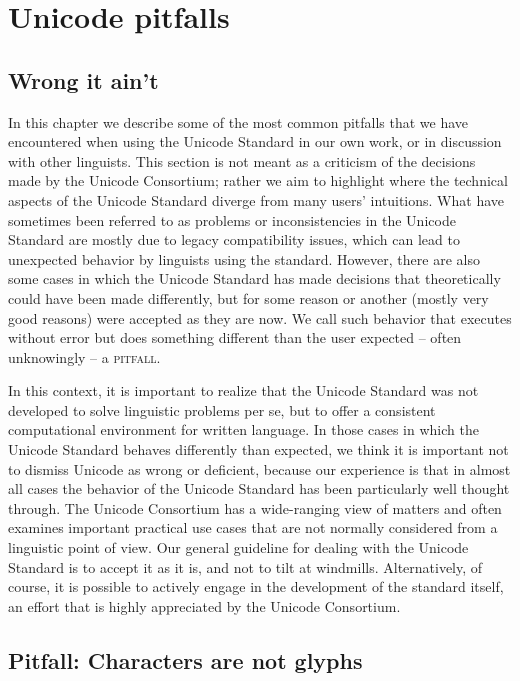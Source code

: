 \chapter{Unicode pitfalls}
\label{unicode-pitfalls}

\section{Wrong it ain't}
\label{wrong-it-is-not}

In this chapter we describe some of the most common pitfalls that we have
encountered when using the Unicode Standard in our own work, or in discussion
with other linguists. This section is not meant as a criticism of the decisions
made by the Unicode Consortium; rather we aim to highlight where the
technical aspects of the Unicode Standard diverge from many users'
intuitions. What have sometimes been referred to as problems or inconsistencies
in the Unicode Standard are mostly due to legacy compatibility issues, which can
lead to unexpected behavior by linguists using the standard. However, there are
also some cases in which the Unicode Standard has made decisions that
theoretically could have been made differently, but for some reason or another
(mostly very good reasons) were accepted as they are now. We call such behavior that
executes without error but does something different than the user
expected -- often unknowingly -- a \textsc{pitfall}.

In this context, it is important to realize that the Unicode Standard was not
developed to solve linguistic problems per se, but to offer a consistent
computational environment for written language. In those cases in which the
Unicode Standard behaves differently than expected, we think it is important not
to dismiss Unicode as wrong or deficient, because our
experience is that in almost all cases the behavior of the Unicode Standard has
been particularly well thought through. The Unicode Consortium has a 
wide-ranging view of matters and often examines important practical use cases
that are not normally considered from a linguistic point of view. Our general
guideline for dealing with the Unicode Standard is to accept it as it is, and
not to tilt at windmills. Alternatively, of course, it is possible to actively
engage in the development of the standard itself, an effort that is highly
appreciated by the Unicode Consortium.

\section{Pitfall: Characters are not glyphs}
\label{pitfall-characters-are-not-glyphs}

